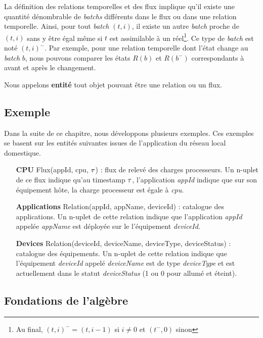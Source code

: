 La définition des relations temporelles et des flux implique qu'il existe une quantité dénombrable de \textit{batchs} différents dans le flux ou dans une relation temporelle. Ainsi, pour tout \textit{batch} $(t,i)$, il existe un autre \textit{batch} proche de $(t,i)$ sans y être égal même si $t$ est assimilable à un réel\footnote{Au final, $(t,i)^- = (t,i-1)$ si $i\neq 0$ et $(t^-,0)$ sinon}. Ce type de \textit{batch} est noté $(t,i)^-$. Par exemple, pour une relation temporelle dont l'état change au \textit{batch} $b$, nous pouvons comparer les états $R(b)$ et $R(b^-)$ correspondants à avant et après le changement.

Nous appelons \textbf{entité} tout objet pouvant être une relation ou un flux.

\subsection{Exemple}\label{sec:contrib:astral:definitions:exemple}
Dans la suite de ce chapitre, nous développons plusieurs exemples. Ces exemples se basent sur les entités suivantes issues de l'application du réseau local domestique.
\begin{itemize}
    \item[\textbf{CPU}] Flux(appId, cpu, $\tau$) : flux de relevé des charges processeurs. Un n-uplet de ce flux indique qu'au timestamp $\tau$, l'application \textit{appId} indique que sur son équipement hôte, la charge processeur est égale à \textit{cpu}.
    \item[\textbf{Applications}] Relation(appId, appName, deviceId) : catalogue des applications. Un n-uplet de cette relation indique que l'application \textit{appId} appelée \textit{appName} est déployée sur le l'équipement \textit{deviceId}.
    \item[\textbf{Devices}] Relation(deviceId, deviceName, deviceType, deviceStatus) : catalogue des équipements. Un n-uplet de cette relation indique que l'équipement \textit{deviceId} appelé \textit{deviceName} est de type \textit{deviceType} et est actuellement dans le statut \textit{deviceStatus} (1 ou 0 pour allumé et éteint).
\end{itemize}

\subsection{Fondations de l'algèbre}
